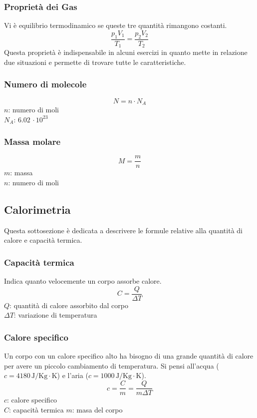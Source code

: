 \subsubsection{Proprietà dei Gas}
Vi è equilibrio termodinamico se queste tre quantità rimangono costanti.
\begin{equation*}
\frac{p_1V_1}{T_1} = \frac{p_2V_2}{T_2}
\end{equation*}
Questa proprietà è indispensabile in alcuni esercizi in quanto mette in relazione due situazioni e
permette di trovare tutte le caratteristiche.

\subsubsection{Numero di molecole}
\begin{equation*}
N = n \cdot N_A
\end{equation*}
$n$: numero di moli\\
\hyperref[tab:Na]{$N_A$}: $6.02\,\cdot10^{23}$

\subsubsection{Massa molare}
\begin{equation*}
M = \frac{m}{n}
\end{equation*}
$m$: massa\\
$n$: numero di moli

\subsection{Calorimetria}
Questa sottosezione è dedicata a descrivere le formule relative alla quantità di calore e capacità
termica.

\subsubsection{Capacità termica}
Indica quanto velocemente un corpo assorbe calore.
\begin{equation*}
  C = \frac{Q}{\Delta T}
\end{equation*}
$Q$: quantità di calore assorbito dal corpo\\
$\Delta T$: variazione di temperatura\\

\subsubsection{Calore specifico}
Un corpo con un calore specifico alto ha bisogno di una grande quantità di calore per avere un piccolo
cambiamento di temperatura. Si pensi all'acqua ($c=4180\,\text{J/Kg}\cdot\text{K}$) e l'aria
($c=1000\,\text{J/Kg}\cdot\text{K}$).
\begin{equation*}
  c = \frac{C}{m} = \frac{Q}{m\Delta T}
\end{equation*}
$c$: calore specifico\\
$C$: capacità termica
$m$: masa del corpo

